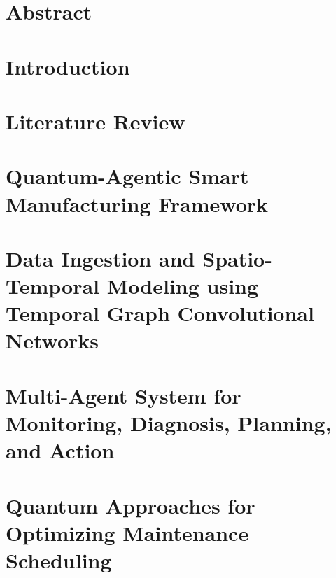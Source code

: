 \documentclass[11pt]{report}
\begin{document}
\chapter*{Abstract}

\endgroup


\clearpage
{}
\setcounter{page}{1}

\chapter{Introduction}


\renewcommand{\thechapter}{\Roman{chapter}}
\renewcommand{\thesection}{\arabic{chapter}.\arabic{section}}
\chapter{Literature Review}

\renewcommand{\thechapter}{\arabic{chapter}}
\renewcommand{\thesection}{\thechapter.\arabic{section}}

\chapter{Quantum-Agentic Smart Manufacturing Framework}


\chapter{Data Ingestion and Spatio-Temporal Modeling using Temporal Graph Convolutional Networks}
\label{chap:tgcn}


\chapter{Multi-Agent System for Monitoring, Diagnosis, Planning, and Action}
\label{chap:agentic}


\chapter{Quantum Approaches for Optimizing Maintenance Scheduling}
\label{chap:quantum}

\end{document}
